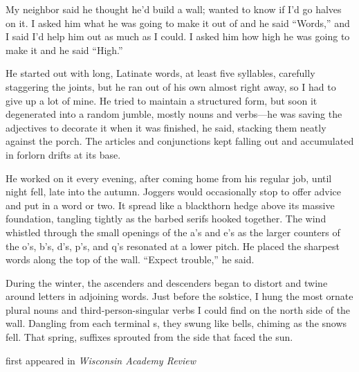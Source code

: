 My neighbor said he thought he'd build a wall; wanted to know if I'd go
halves on it. I asked him what he was going to make it out of and he
said ``Words,'' and I said I'd help him out as much as I could. I asked
him how high he was going to make it and he said ``High.''

He started out with long, Latinate words, at least five syllables,
carefully staggering the joints, but he ran out of his own almost right
away, so I had to give up a lot of mine. He tried to maintain a
structured form, but soon it degenerated into a random jumble, mostly
nouns and verbs---he was saving the adjectives to decorate it when it
was finished, he said, stacking them neatly against the porch. The
articles and conjunctions kept falling out and accumulated in forlorn
drifts at its base.

He worked on it every evening, after coming home from his regular job,
until night fell, late into the autumn. Joggers would occasionally stop
to offer advice and put in a word or two. It spread like a blackthorn
hedge above its massive foundation, tangling tightly as the barbed
serifs hooked together. The wind whistled through the small openings of
the a's and e's as the larger counters of the o's, b's, d's, p's, and
q's resonated at a lower pitch. He placed the sharpest words along the
top of the wall. ``Expect trouble,'' he said.

During the winter, the ascenders and descenders began to distort and
twine around letters in adjoining words. Just before the solstice, I
hung the most ornate plural nouns and third-person-singular verbs I
could find on the north side of the wall. Dangling from each terminal s,
they swung like bells, chiming as the snows fell. That spring, suffixes
sprouted from the side that faced the sun.

first appeared in \emph{Wisconsin Academy Review}
